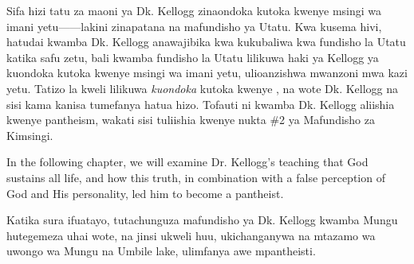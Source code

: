 Sifa hizi tatu za maoni ya Dk. Kellogg zinaondoka kutoka kwenye msingi wa imani yetu——lakini zinapatana na mafundisho ya Utatu. Kwa kusema hivi, hatudai kwamba Dk. Kellogg anawajibika kwa kukubaliwa kwa fundisho la Utatu katika safu zetu, bali kwamba fundisho la Utatu lilikuwa haki ya Kellogg ya kuondoka kutoka kwenye msingi wa imani yetu, ulioanzishwa mwanzoni mwa kazi yetu. Tatizo la kweli lilikuwa \textit{kuondoka} kutoka kwenye , na wote Dk. Kellogg na sisi kama kanisa tumefanya hatua hizo. Tofauti ni kwamba Dk. Kellogg aliishia kwenye pantheism, wakati sisi tuliishia kwenye nukta \#2 ya Mafundisho za Kimsingi.


In the following chapter, we will examine Dr. Kellogg's teaching that God sustains all life, and how this truth, in combination with a false perception of God and His personality, led him to become a pantheist.


Katika sura ifuatayo, tutachunguza mafundisho ya Dk. Kellogg kwamba Mungu hutegemeza uhai wote, na jinsi ukweli huu, ukichanganywa na mtazamo wa uwongo wa Mungu na Umbile lake, ulimfanya awe mpantheisti.






